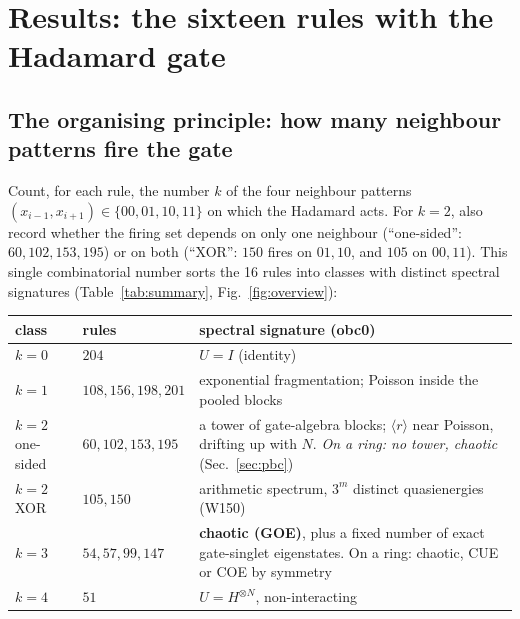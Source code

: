 \section{Results: the sixteen rules with the Hadamard gate}
\label{sec:results}

\subsection{The organising principle: how many neighbour patterns fire the gate}

Count, for each rule, the number $k$ of the four neighbour patterns $(x_{i-1},x_{i+1})\in\{00,01,10,11\}$ on which the
Hadamard acts. For $k=2$, also record whether the firing set depends on only one neighbour (``one-sided'': $60,102,153,195$)
or on both (``XOR'': $150$ fires on $01,10$, and $105$ on $00,11$). This single combinatorial number sorts the 16 rules into
classes with distinct spectral signatures (Table~\ref{tab:summary}, Fig.~\ref{fig:overview}):

\begin{center}
\small
\begin{tabular}{llp{}}
\toprule
class & rules & spectral signature (obc0) \\
\midrule
$k=0$ & $204$ & $U=I$ (identity) \\
$k=1$ & $108,156,198,201$ & exponential fragmentation; Poisson inside the pooled blocks \\
$k=2$ one-sided & $60,102,153,195$ & a tower of gate-algebra blocks; $\langle r\rangle$ near Poisson, drifting up with $N$.
  \emph{On a ring: no tower, chaotic} (Sec.~\ref{sec:pbc}) \\
$k=2$ XOR & $105,150$ & arithmetic spectrum, $3^m$ distinct quasienergies (W150) \\
$k=3$ & $54,57,99,147$ & \textbf{chaotic (GOE)}, plus a fixed number of exact gate-singlet eigenstates.
  On a ring: chaotic, CUE or COE by symmetry \\
$k=4$ & $51$ & $U=H^{\otimes N}$, non-interacting \\
\bottomrule
\end{tabular}
\end{center}

